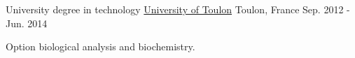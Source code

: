 \begin{cventries}
  \cventry
    {University degree in technology} %
    {\href{http://www.univ-tln.fr/}{University of Toulon}} %
    {Toulon, France} %
    {Sep. 2012 - Jun. 2014} %
    {
      \begin{cvitems} %
        \item {Option biological analysis and biochemistry.}
      \end{cvitems}
      \\
    }

\end{cventries}
